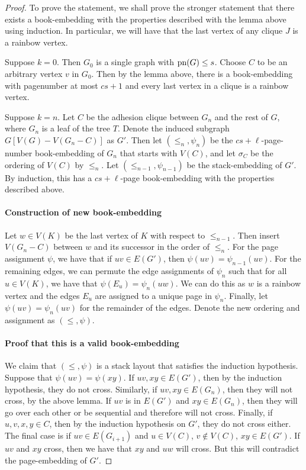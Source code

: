 \begin{proof}
	To prove the statement, we shall prove the stronger statement that there exists a book-embedding with the properties described with the lemma above using induction. In particular, we will have that the last vertex of any clique \(J\) is a rainbow vertex.
	
	Suppose \(k = 0\). Then \(G_0\) is a single graph with \(\text{pn}(G) \leq s\). Choose \(C\) to be an arbitrary vertex \(v\) in \(G_0\). Then by the lemma above, there is a book-embedding with pagenumber at most \(cs + 1\) and every last vertex in a clique is a rainbow vertex.
	
	Suppose \(k = n\). Let \(C\) be the adhesion clique between \(G_n\) and the rest of \(G\), where \(G_n\) is a leaf of the tree \(T\). Denote the induced subgraph \(G[V(G) - V(G_n - C)]\) as \(G'\). Then let \((\leq_n, \psi_n)\) be the \(cs + \ell\)-page-number book-embedding of \(G_n\) that starts with \(V(C)\), and let \(\sigma_C\) be the ordering of \(V(C)\) by \(\leq_n\). Let \((\leq_{n-1}, \psi_{n-1})\) be the stack-embedding of \(G'\). By induction, this has a \(cs + \ell\)-page book-embedding with the properties described above.
	
	\paragraph{Construction of new book-embedding}
	Let \(w \in V(K)\) be the last vertex of \(K\) with respect to \(\leq_{n-1}\). Then insert \(V(G_n - C)\) between \(w\) and its successor in the order of \(\leq_{n}\). For the page assignment \(\psi\), we have that if \(uv \in E(G')\), then \(\psi(uv) = \psi_{n-1}(uv)\). For the remaining edges, we can permute the edge assignments of \(\psi_n\) such that for all \(u \in V(K)\), we have that \(\psi(E_u) = \psi_n(uw)\). We can do this as \(w\) is a rainbow vertex and the edges \(E_u\) are assigned to a unique page in \(\psi_n\). Finally, let \(\psi(uv) = \psi_n(uv)\) for the remainder of the edges. Denote the new ordering and assignment as \((\leq, \psi)\). 
	\paragraph{Proof that this is a valid book-embedding}
	We claim that \((\leq , \psi)\) is a stack layout that satisfies the induction hypothesis. Suppose that \(\psi(uv) = \psi(xy)\). If \(uv, xy \in E(G')\), then by the induction hypothesis, they do not cross. Similarly, if \(uv, xy \in E(G_n)\), then they will not cross, by the above lemma. If \(uv\) is in \(E(G')\) and \(xy \in E(G_n)\), then they will go over each other or be sequential and therefore will not cross. 
	Finally, if \(u, v, x, y \in C\), then by the induction hypothesis on \(G'\), they do not cross either. The final case is if \(uv \in E(G_{i + 1})\) and \(u \in V(C)\), \(v \notin V(C)\), \(xy \in E(G')\). If \(uv\) and \(xy\) cross, then we have that \(xy\) and \(uw\) will cross. But this will contradict the page-embedding of \(G'\).
	

\end{proof}
